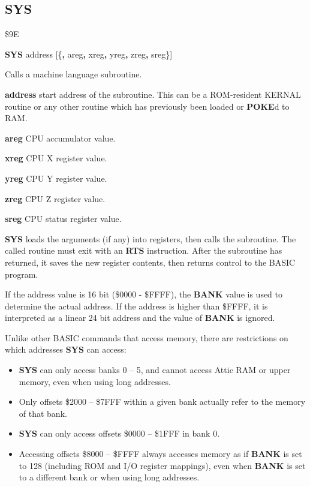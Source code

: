 \subsection{SYS}
\begin{description}[leftmargin=2cm,style=nextline]
\item [Token:]    \$9E

\item [Format:]   {\bf SYS} address [\{{\bf,} areg{\bf,} xreg{\bf,} yreg{\bf,}	zreg{\bf,} sreg\}]

\item [Usage:]    Calls a machine language subroutine.

                  {\bf address} start address of the subroutine. This can be a ROM-resident KERNAL routine or any other routine which has previously been loaded or {\bf POKE}d to RAM.

                  {\bf areg} CPU accumulator value.

                  {\bf xreg} CPU X register value.

                  {\bf yreg} CPU Y register value.

                  {\bf zreg} CPU Z register value.

                  {\bf sreg} CPU status register value.

                  {\bf SYS} loads the arguments (if any) into registers, then calls the subroutine. The called routine must exit with an {\bf RTS} instruction. After the subroutine has returned, it saves the new register contents, then returns control to the BASIC program.

                  If the address value is 16 bit (\$0000 - \$FFFF), the {\bf BANK} value is used to determine the actual address. If the address is higher than \$FFFF, it is interpreted as a linear 24 bit address and the value of {\bf BANK} is ignored.

                  Unlike other BASIC commands that access memory, there are restrictions on which addresses {\bf SYS} can access:

                  \begin{itemize}
                     \item {\bf SYS} can only access banks 0 -- 5, and cannot access Attic RAM or upper memory, even when using long addresses.
                     \item Only offsets \$2000 -- \$7FFF within a given bank actually refer to the memory of that bank.
                     \item {\bf SYS} can only access offsets \$0000 -- \$1FFF in bank 0.
                     \item Accessing offsets \$8000 -- \$FFFF always accesses memory as if {\bf BANK} is set to 128 (including ROM and I/O register mappings), even when {\bf BANK} is set to a different bank or when using long addresses.
                  \end{itemize}


\end{description}
